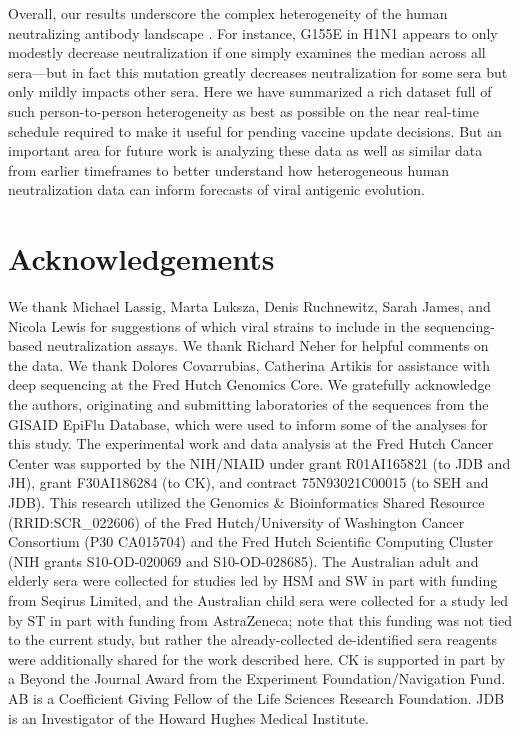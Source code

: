 Overall, our results underscore the complex heterogeneity of the human neutralizing antibody landscape \citep{cobey2017,lee2019,kikawa2026b}. For instance, G155E in H1N1 appears to only modestly decrease neutralization if one simply examines the median across all sera---but in fact this mutation greatly decreases neutralization for some sera but only mildly impacts other sera. Here we have summarized a rich dataset full of such person-to-person heterogeneity as best as possible on the near real-time schedule required to make it useful for pending vaccine update decisions. But an important area for future work is analyzing these data as well as similar data from earlier timeframes \citep{kikawa2025,kikawa2026a} to better understand how heterogeneous human neutralization data can inform forecasts of viral antigenic evolution.


\fontsize{8.5}{10.5}\selectfont

\section{Acknowledgements}

We thank Michael Lassig, Marta Luksza, Denis Ruchnewitz, Sarah James, and Nicola Lewis for suggestions of which viral strains to include in the sequencing-based neutralization assays. We thank Richard Neher for helpful comments on the data. We thank Dolores Covarrubias, Catherina Artikis for assistance with deep sequencing at the Fred Hutch Genomics Core. We gratefully acknowledge the authors, originating and submitting laboratories of the sequences from the GISAID EpiFlu Database, which were used to inform some of the analyses for this study. The experimental work and data analysis at the Fred Hutch Cancer Center was supported by the NIH/NIAID under grant R01AI165821 (to JDB and JH), grant F30AI186284 (to CK), and contract 75N93021C00015 (to SEH and JDB). This research utilized the Genomics \& Bioinformatics Shared Resource (RRID:SCR\_022606) of the Fred Hutch/University of Washington Cancer Consortium (P30 CA015704) and the Fred Hutch Scientific Computing Cluster (NIH grants S10-OD-020069 and S10-OD-028685). The Australian adult and elderly sera were collected for studies led by HSM and SW in part with funding from Seqirus Limited, and the Australian child sera were collected for a study led by ST in part with funding from AstraZeneca; note that this funding was not tied to the current study, but rather the already-collected de-identified sera reagents were additionally shared for the work described here. CK is supported in part by a Beyond the Journal Award from the Experiment Foundation/Navigation Fund. AB is a Coefficient Giving Fellow of the Life Sciences Research Foundation. JDB is an Investigator of the Howard Hughes Medical Institute.

